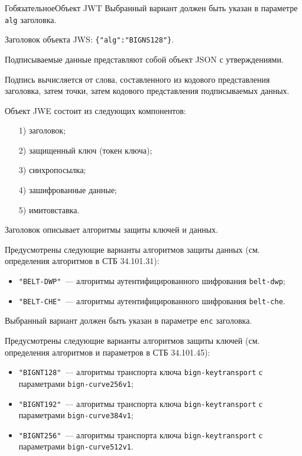 \begin{appendix}{Г}{обязательное}{Объект JWT}
Выбранный вариант должен быть указан в параметре \lstinline{alg} заголовка.

\begin{example*}
Заголовок объекта JWS: \lstinline|{"alg":"BIGNS128"}|.
\end{example*}

Подписываемые данные представляют собой объект JSON с утверждениями. 

Подпись вычисляется от слова, составленного из кодового представления 
заголовка, затем точки, затем кодового представления подписываемых данных. 


Объект JWE состоит из следующих компонентов:
\begin{enumerate}
\item[1)] 
заголовок;
\item[2)] 
защищенный ключ (токен ключа);
\item[3)] 
синхропосылка;
\item[4)]
зашифрованные данные;
\item[5)]
имитовставка.
\end{enumerate}

Заголовок описывает алгоритмы защиты ключей и данных.

Предусмотрены следующие варианты алгоритмов защиты данных
(см. определения алгоритмов в СТБ 34.101.31):
\begin{itemize}
\item
\lstinline{"BELT-DWP"}~--- алгоритмы аутентифицированного шифрования 
\lstinline{belt-dwp}; 
\item
\lstinline{"BELT-CHE"}~--- алгоритмы аутентифицированного шифрования 
\lstinline{belt-che}.
\end{itemize}

Выбранный вариант должен быть указан в параметре \lstinline{enc} заголовка.

Предусмотрены следующие варианты алгоритмов защиты ключей
(см. определения алгоритмов и параметров в СТБ 34.101.45):
\begin{itemize}
\item
\lstinline{"BIGNT128"}~--- алгоритмы транспорта ключа 
\lstinline{bign-keytransport} с параметрами \lstinline{bign-curve256v1};
\item
\lstinline{"BIGNT192"}~--- алгоритмы транспорта ключа 
\lstinline{bign-keytransport} с параметрами \lstinline{bign-curve384v1};
\item
\lstinline{"BIGNT256"}~--- алгоритмы транспорта ключа 
\lstinline{bign-keytransport} с параметрами \lstinline{bign-curve512v1}. 
\end{itemize}


\end{appendix}
